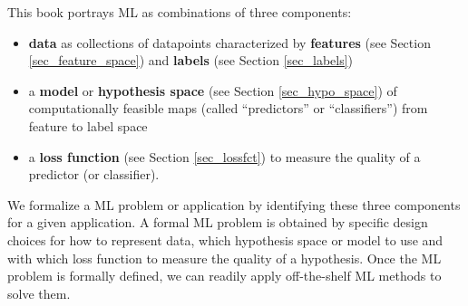 \documentclass[12pt]{report}
\begin{document}
%
%
%
This book portrays ML as combinations of three components: 
\begin{itemize}
	\item {\bf data} as collections of datapoints characterized by 
	{\bf features} (see Section \ref{sec_feature_space}) and {\bf labels} 
	(see Section \ref{sec_labels}) 
	\item a {\bf model} or {\bf hypothesis space} (see Section \ref{sec_hypo_space}) 
	of computationally feasible maps (called ``predictors'' or ``classifiers'') 
	from feature to label space 
	\item a {\bf loss function} (see Section \ref{sec_lossfct}) to measure 
	the quality of a predictor (or classifier). 
\end{itemize}
We formalize a ML problem or application by identifying these three 
components for a given application. A formal ML problem is obtained 
by specific design choices for how to represent data, which hypothesis 
space or model to use and with which loss function to measure the 
quality of a hypothesis. Once the ML problem is formally defined, 
we can readily apply off-the-shelf ML methods to solve them. 
\end{document}
